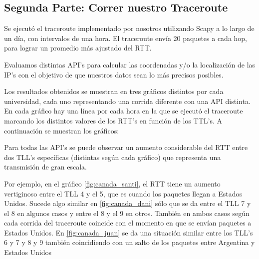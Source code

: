 \subsection{Segunda Parte: Correr nuestro Traceroute}

Se ejecutó el traceroute implementado por nosotros utilizando Scapy a lo largo de un día, con intervalos de una hora. El traceroute envía 20 paquetes a cada hop, para lograr un promedio más ajustado del RTT.

Evaluamos distintas API's para calcular las coordenadas y/o la localización de las IP's con el objetivo de que nuestros datos sean lo más precisos posibles.


Los resultados obtenidos se muestran en tres gráficos distintos por cada universidad, cada uno representando una corrida diferente con una API distinta. En cada gráfico hay una línea por cada hora en la que se ejecutó el traceroute marcando los distintos valores de los RTT's en función de los TTL's. A continuación se muestran los gráficos:



 


 

 

Para todas las API's se puede observar un aumento considerable del RTT entre dos TLL's específicas (distintas según cada gráfico) que representa una transmisión de gran escala. 

Por ejemplo, en el gráfico \ref{fig:canada_santi}, el RTT tiene un aumento vertiginoso entre el TLL 4 y el 5, que es cuando los paquetes llegan a Estados Unidos. Sucede algo similar en \ref{fig:canada_dani} sólo que se da entre el TLL 7 y el 8 en algunos casos y entre el 8 y el 9 en otros. También en ambos casos según cada corrida del traceroute coincide con el momento en que se envían paquetes a Estados Unidos. En \ref{fig:canada_juan} se da una situación similar entre los TLL's 6 y 7 y 8 y 9 también coincidiendo con un salto de los paquetes entre Argentina y Estados Unidos

